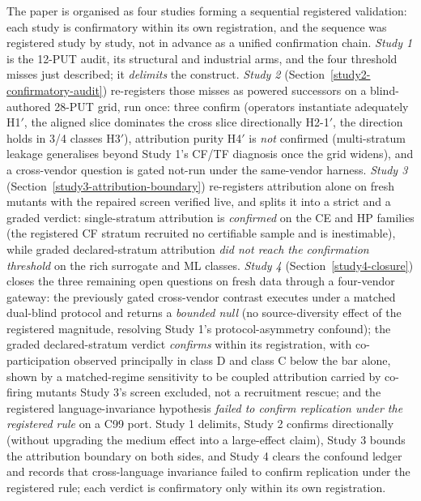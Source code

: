 \documentclass[manuscript,screen,review]{acmart}
\begin{document}
The paper is organised as four studies forming a sequential registered
validation: each study is confirmatory within its own registration, and the
sequence was registered study by study, not in advance as a unified
confirmation chain.
\emph{Study 1} is the 12-PUT audit, its structural and industrial arms, and the
four threshold misses just described; it \emph{delimits} the construct.
\emph{Study 2} (Section~\ref{study2-confirmatory-audit}) re-registers those
misses as powered successors on a blind-authored 28-PUT grid, run once: three
confirm (operators instantiate adequately H1\('\), the aligned slice dominates
the cross slice directionally H2-1\('\), the direction holds in 3/4 classes
H3\('\)), attribution purity H4\('\) is \emph{not} confirmed (multi-stratum
leakage generalises beyond Study 1's CF/TF diagnosis once the grid widens), and
a cross-vendor question is gated not-run under the same-vendor harness.
\emph{Study 3} (Section~\ref{study3-attribution-boundary}) re-registers
attribution alone on fresh mutants with the repaired screen verified live, and
splits it into a strict and a graded verdict: single-stratum attribution is
\emph{confirmed} on the CE and HP families (the registered CF stratum
recruited no certifiable sample and is inestimable), while graded
declared-stratum attribution \emph{did not reach the confirmation threshold}
on the rich surrogate and ML classes. \emph{Study 4} (Section~\ref{study4-closure}) closes the three
remaining open questions on fresh data through a four-vendor gateway: the
previously gated cross-vendor contrast executes under a matched dual-blind
protocol and returns a \emph{bounded null} (no source-diversity effect of the
registered magnitude, resolving Study 1's protocol-asymmetry confound); the
graded declared-stratum verdict \emph{confirms} within its registration, with
co-participation observed principally in class D and class C below the bar
alone, shown by a matched-regime sensitivity to be coupled attribution carried
by co-firing mutants Study 3's screen excluded, not a recruitment rescue; and
the registered language-invariance hypothesis \emph{failed to confirm
replication under the registered rule} on a C99 port. Study 1
delimits, Study 2 confirms directionally (without upgrading the medium effect
into a large-effect claim), Study 3 bounds the attribution boundary on both
sides, and Study 4 clears the confound ledger and records that cross-language
invariance failed to confirm replication under the registered rule; each
verdict is confirmatory only within its own registration.
\end{document}
